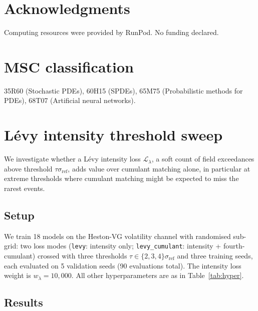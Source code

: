 \documentclass[review,12pt]{elsarticle}
\begin{document}
\section*{Acknowledgments}

Computing resources were provided by RunPod. No funding declared.

\section*{MSC classification}

35R60 (Stochastic PDEs), 60H15 (SPDEs), 65M75 (Probabilistic
methods for PDEs), 68T07 (Artificial neural networks).




\appendix

\section{L\'evy intensity threshold sweep}
\label{app:levy-tau}

We investigate whether a L\'evy intensity loss
\(\mathcal{L}_{\lambda}\), a soft count of field exceedances
above threshold \(\tau\sigma_{\mathrm{ref}}\), adds value
over cumulant matching alone, in particular at extreme thresholds
where cumulant matching might be expected to miss the rarest
events.

\subsection{Setup}

We train 18 models on the Heston-VG volatility channel with
randomised sub-grid: two loss modes
(\texttt{levy}: intensity only; \texttt{levy\_cumulant}: intensity
+ fourth-cumulant) crossed with three thresholds
\(\tau \in \{2, 3, 4\}\sigma_{\mathrm{ref}}\) and three training
seeds, each evaluated on 5 validation seeds (90 evaluations
total). The intensity loss weight is \(w_\lambda = 10{,}000\).
All other hyperparameters are as in Table~\ref{tab:hyper}.

\subsection{Results}
\end{document}

